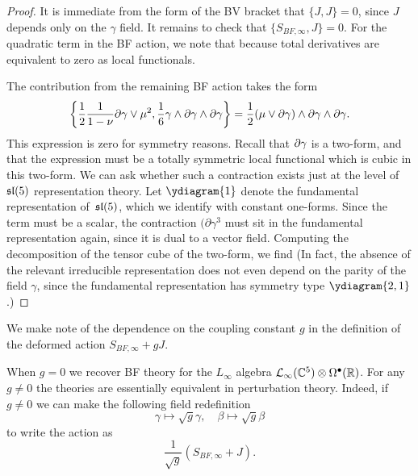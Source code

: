 \begin{proof}

It is immediate from the form of the BV bracket that $\{J,J\} = 0$, since $J$ depends only on the $\gamma$ field. 
It remains to check that $\{S_{BF,\infty},J\} = 0$. 
For the quadratic term in the BF action, we note that 
  because total derivatives are equivalent to zero as local functionals. 
  
The contribution from the remaining BF action takes the form
\[
    \left\{ \frac12 \frac{1}{1-\nu} \partial\gamma \vee \mu^2, \frac16 \gamma \wedge \partial\gamma \wedge \partial \gamma \right\} =\frac12 (\mu \vee \partial \gamma) \wedge \partial \gamma \wedge \partial \gamma .
\]
This expression is zero for symmetry reasons. 
Recall that $\partial\gamma$ is a two-form, and that the expression must be a totally symmetric local functional which is cubic in this two-form. We can ask whether such a  contraction exists just at the level of $\mathfrak{sl}(5)$ representation theory. Let $\ydiagram{1}$ denote the fundamental representation of~$\mathfrak{sl}(5)$, which we identify with constant one-forms. Since the term must be a scalar, the contraction $(\partial\gamma^3$ must sit in the fundamental representation again, since it is dual to a vector field. Computing the decomposition of the tensor cube of the two-form, we find
(In fact, the absence  of the relevant irreducible representation does not  even depend on the parity of the  field $\gamma$, since 
the  fundamental representation has symmetry type $\ydiagram{2,1}$.) 
\end{proof}

\parsec[s:coupling]

We make note of the dependence on the coupling constant $g$ in the definition of the deformed action $S_{BF,\infty} + g J$. 

When $g = 0$ we recover BF theory for the $L_\infty$ algebra $\mathcal L_\infty(\mathbb C^5) \otimes \Omega^\bullet(\mathbb R)$. 
For any $g \ne 0$ the theories are essentially equivalent in perturbation theory. 
Indeed, if $g \ne 0$ we can make the following field redefinition 
\[
\gamma \mapsto \sqrt{g} \gamma, \quad \beta \mapsto \sqrt{g} \beta 
\]
to write the action as 
\[
\frac{1}{\sqrt{g}} \left(S_{BF,\infty} + J \right)  .
\]

